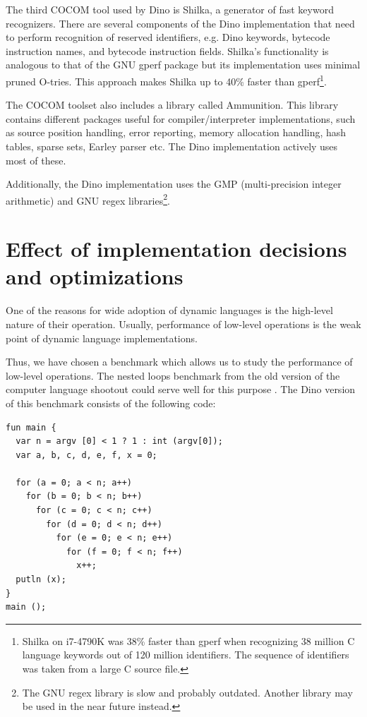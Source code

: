 \documentclass[preprint]{sigplanconf}
\begin{document}
The third COCOM tool used by Dino is Shilka, a generator of fast keyword recognizers.
There are several components of the Dino implementation that need to perform recognition
of reserved identifiers, e.g. Dino keywords, bytecode instruction
names, and bytecode instruction fields.  Shilka's functionality is analogous to that of the GNU
gperf package but its implementation uses minimal pruned O-tries.  This approach makes Shilka
up to 40\% faster than gperf\footnote{Shilka on i7-4790K was 38\%
  faster than gperf when recognizing 38 million C language keywords
  out of 120 million identifiers.  The sequence of identifiers was taken from a
  large C source file.}.

The COCOM toolset also includes a library called Ammunition. This library contains
different packages useful for compiler/interpreter implementations, such as
source position handling, error reporting, memory allocation handling,
hash tables, sparse sets, Earley parser etc.  The Dino implementation
actively uses most of these.

Additionally, the Dino implementation uses the GMP (multi-precision integer arithmetic)
and GNU regex libraries\footnote {The GNU regex library is slow and
probably outdated. Another library may be used in the near future
instead.}.

\section{Effect of implementation decisions and optimizations}
\label{model_benchmarks}

  One of the reasons for wide adoption of dynamic languages is the
high-level nature of their operation.  Usually, performance of low-level
operations is the weak point of dynamic language implementations.

  Thus, we have chosen a benchmark which allows us to study the
performance of low-level operations. The nested loops benchmark from the old
version of the
computer language shootout could serve well for
this purpose \cite{Benchmarks}.  The Dino version of this benchmark consists of the following code:

{\scriptsize
\begin{verbatim}
fun main {
  var n = argv [0] < 1 ? 1 : int (argv[0]);
  var a, b, c, d, e, f, x = 0;

  for (a = 0; a < n; a++)
    for (b = 0; b < n; b++)
      for (c = 0; c < n; c++)
        for (d = 0; d < n; d++)
          for (e = 0; e < n; e++)
            for (f = 0; f < n; f++)
              x++;
  putln (x);
}
main ();
\end{verbatim}
}
\end{document}
